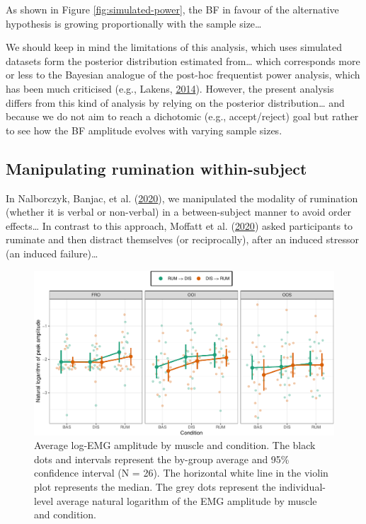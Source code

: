 \documentclass[
  english,
  man,floatsintext]{apa6}
\begin{document}
As shown in Figure \ref{fig:simulated-power}, the BF in favour of the alternative hypothesis is growing proportionally with the sample size\ldots{}

We should keep in mind the limitations of this analysis, which uses simulated datasets form the posterior distribution estimated from\ldots{} which corresponds more or less to the Bayesian analogue of the post-hoc frequentist power analysis, which has been much criticised (e.g., Lakens, \protect\hyperlink{ref-lakens_20_2014}{2014}). However, the present analysis differs from this kind of analysis by relying on the posterior distribution\ldots{} and because we do not aim to reach a dichotomic (e.g., accept/reject) goal but rather to see how the BF amplitude evolves with varying sample sizes.

\hypertarget{manipulating-rumination-within-subject}{%
\subsection{Manipulating rumination within-subject}\label{manipulating-rumination-within-subject}}

In Nalborczyk, Banjac, et al. (\protect\hyperlink{ref-nalborczyk_dissociating_2020}{2020}), we manipulated the modality of rumination (whether it is verbal or non-verbal) in a between-subject manner to avoid order effects\ldots{} In contrast to this approach, Moffatt et al. (\protect\hyperlink{ref-moffatt_inner_2020}{2020}) asked participants to ruminate and then distract themselves (or reciprocally), after an induced stressor (an induced failure)\ldots{}

\begin{figure}[!htb]

{\centering \includegraphics[width=1\linewidth]{reanalysis_files/figure-latex/order-1} 

}

\caption{Average log-EMG amplitude by muscle and condition. The black dots and intervals represent the by-group average and 95\% confidence interval (N = 26). The horizontal white line in the violin plot represents the median. The grey dots represent the individual-level average natural logarithm of the EMG amplitude by muscle and condition.}\label{fig:order}
\end{figure}
\end{document}
